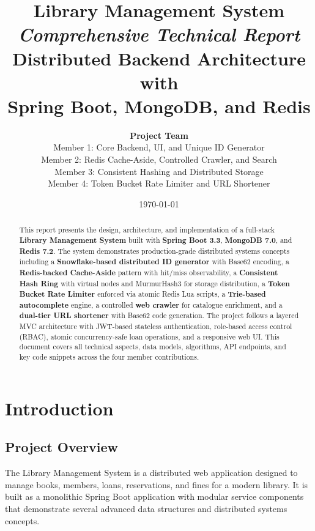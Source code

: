 \documentclass[12pt,a4paper]{report}
\title{
    \vspace{2cm}
    {\Huge\bfseries Library Management System}\\[0.8cm]
    {\Large\itshape Comprehensive Technical Report}\\[1.5cm]
    {\large Distributed Backend Architecture with\\
    Spring Boot, MongoDB, and Redis}\\[2cm]
}
\author{
    \textbf{Project Team}\\[0.3cm]
    Member 1: Core Backend, UI, and Unique ID Generator\\
    Member 2: Redis Cache-Aside, Controlled Crawler, and Search\\
    Member 3: Consistent Hashing and Distributed Storage\\
    Member 4: Token Bucket Rate Limiter and URL Shortener
}
\date{\today}
\begin{document}
\maketitle
\thispagestyle{empty}
\newpage

\begin{abstract}
This report presents the design, architecture, and implementation of a full-stack \textbf{Library Management System} built with \textbf{Spring Boot 3.3}, \textbf{MongoDB 7.0}, and \textbf{Redis 7.2}. The system demonstrates production-grade distributed systems concepts including a \textbf{Snowflake-based distributed ID generator} with Base62 encoding, a \textbf{Redis-backed Cache-Aside} pattern with hit/miss observability, a \textbf{Consistent Hash Ring} with virtual nodes and MurmurHash3 for storage distribution, a \textbf{Token Bucket Rate Limiter} enforced via atomic Redis Lua scripts, a \textbf{Trie-based autocomplete} engine, a controlled \textbf{web crawler} for catalogue enrichment, and a \textbf{dual-tier URL shortener} with Base62 code generation. The project follows a layered MVC architecture with JWT-based stateless authentication, role-based access control (RBAC), atomic concurrency-safe loan operations, and a responsive web UI. This document covers all technical aspects, data models, algorithms, API endpoints, and key code snippets across the four member contributions.
\end{abstract}

\tableofcontents
\newpage

\chapter{Introduction}

\section{Project Overview}
The Library Management System is a distributed web application designed to manage books, members, loans, reservations, and fines for a modern library. It is built as a monolithic Spring Boot application with modular service components that demonstrate several advanced data structures and distributed systems concepts.
\end{document}
